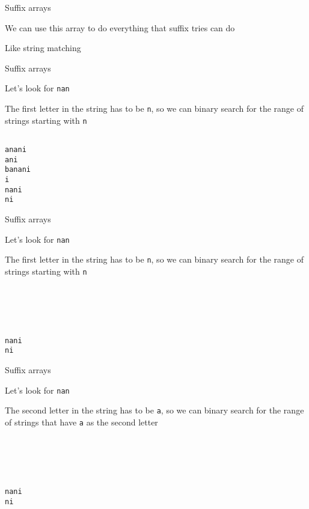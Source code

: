 \begin{frame}[fragile]{Suffix arrays}
    \bi
        \item We can use this array to do everything that suffix tries can do
            \vspace{10pt}
        \item Like string matching
    \ei
\end{frame}

\begin{frame}[fragile]{Suffix arrays}
    \bi
\item Let's look for \texttt{nan}
\item<2-> The first letter in the string has to be \texttt{n}, so we can binary search for the range of strings starting with \texttt{n}
    \ei
    \vspace{10pt}
    \begin{verbatim}

anani
ani
banani
i
nani
ni
    \end{verbatim}
\end{frame}

\begin{frame}[fragile]{Suffix arrays}
    \bi
\item Let's look for \texttt{nan}
\item The first letter in the string has to be \texttt{n}, so we can binary search for the range of strings starting with \texttt{n}
    \ei
    \vspace{10pt}
    \begin{verbatim}





nani
ni
    \end{verbatim}
\end{frame}

\begin{frame}[fragile]{Suffix arrays}
    \bi
\item Let's look for \texttt{nan}
\item The second letter in the string has to be \texttt{a}, so we can binary search for the range of strings that have \texttt{a} as the second letter
    \ei
    \vspace{10pt}
    \begin{verbatim}





nani
ni
    \end{verbatim}
\end{frame}

